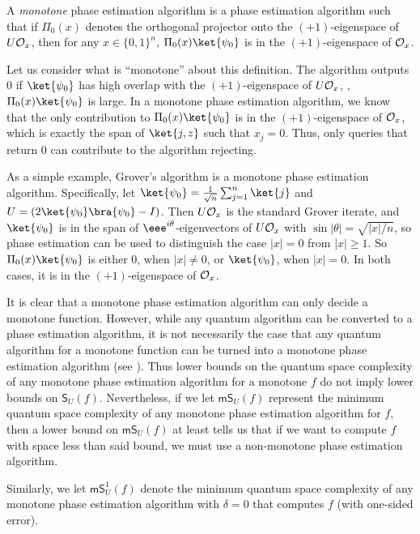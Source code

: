 \documentclass{toc}
\begin{document}
\begin{definition}\label{def:monotone}
A \emph{monotone} phase estimation algorithm is a phase estimation algorithm such that if $\Pi_0(x)$ denotes the orthogonal projector onto the $(+1)$-eigenspace of $U{\cal O}_x$, then for any $x\in\{0,1\}^n$, $\Pi_0(x)\ket{\psi_0}$ is in the $(+1)$-eigenspace of ${\cal O}_x$. 
\end{definition}

Let us consider what is ``monotone'' about this definition. The algorithm outputs 0 if $\ket{\psi_0}$ has high overlap with the $(+1)$-eigenspace of $U{\cal O}_x$, \ie, $\Pi_0(x)\ket{\psi_0}$ is large. In a monotone phase estimation algorithm, we know that the only contribution to $\Pi_0(x)\ket{\psi_0}$ is in the $(+1)$-eigenspace of ${\cal O}_x$, which is exactly the span of $\ket{j,z}$ such that $x_j=0$. Thus, only queries that return 0 can contribute to the algorithm rejecting. 

As a simple example, Grover's algorithm is a monotone phase estimation algorithm. Specifically, let $\ket{\psi_0}=\frac{1}{\sqrt{n}}\sum_{j=1}^n\ket{j}$ and $U=(2\ket{\psi_0}\bra{\psi_0}-I)$. Then $U{\cal O}_x$ is the standard Grover iterate, and $\ket{\psi_0}$ is in the span of $\eee^{i\theta}$-eigenvectors of $U{\cal O}_x$ with $\sin|\theta|=\sqrt{|x|/n}$, so phase estimation can be used to distinguish the case $|x|=0$ from $|x|\geq 1$. So $\Pi_0(x)\ket{\psi_0}$ is either 0, when $|x|\neq 0$, or $\ket{\psi_0}$, when $|x|=0$. In both cases, it is in the $(+1)$-eigenspace of ${\cal O}_x$.

It is clear that a monotone phase estimation algorithm can only decide a monotone function. However, while any quantum algorithm can be converted to a phase estimation algorithm, it is not necessarily the case that any quantum algorithm for a monotone function can be turned into a monotone phase estimation algorithm (see ). 
Thus lower bounds on the quantum space complexity of any monotone phase estimation algorithm for a monotone $f$ do not imply lower bounds on $\mathsf{S}_U(f)$. Nevertheless, if we let $\mathsf{mS}_U(f)$ represent the minimum quantum space complexity of any monotone phase estimation algorithm for $f$, then a lower bound on $\mathsf{mS}_U(f)$ at least tells us that if we want to compute $f$ with space less than said bound, we must use a non-monotone phase estimation algorithm. 

Similarly, we let $\mathsf{mS}_U^1(f)$ denote the minimum quantum space complexity of any monotone phase estimation algorithm with $\delta=0$ that computes $f$ (with one-sided error). 
\end{document}

